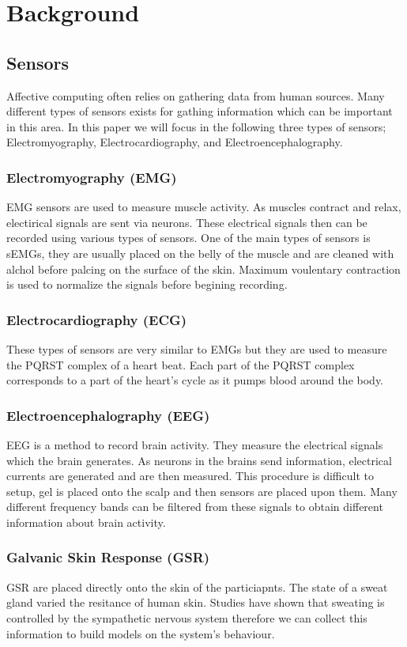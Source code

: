\clearpage
\section{Background}
\label{sec:background}
\subsection{Sensors}
Affective computing often relies on gathering data from human sources.
Many different types of sensors exists for
gathing information which can be important in this area.
In this paper we will focus in the following three types of sensors;
Electromyography,
Electrocardiography,
and Electroencephalography.

\subsubsection{Electromyography (EMG)}
EMG sensors are used to measure muscle activity.
As muscles contract and relax,
electirical signals are sent via neurons.
These electrical signals then
can be recorded using various types of sensors.
One of the main types of sensors is sEMGs,
they are usually placed on the belly of the muscle
and are cleaned with alchol before palcing
on the surface of the skin.
Maximum voulentary contraction is used to normalize the signals
before begining recording.

\subsubsection{Electrocardiography (ECG)}
These types of sensors are very similar to EMGs
but they are used to measure the PQRST complex of a heart beat.
Each part of the PQRST complex
corresponds to a part of the heart's cycle as it pumps blood around the body.

\subsubsection{Electroencephalography (EEG)}
EEG is a method to record brain activity.
They measure the electrical signals which the brain generates.
As neurons in the brains send information,
electrical currents are generated and are then measured.
This procedure is difficult to setup,
gel is placed onto the scalp and then sensors are placed upon them.
Many different frequency bands can be filtered from these
signals to obtain different information about brain activity.

\subsubsection{Galvanic Skin Response (GSR)}
GSR are placed directly onto the skin of the particiapnts.
The state of a sweat gland varied the resitance of human skin.
Studies have shown that sweating is controlled by the sympathetic nervous system
therefore we can collect this information
to build models on the system's behaviour.


